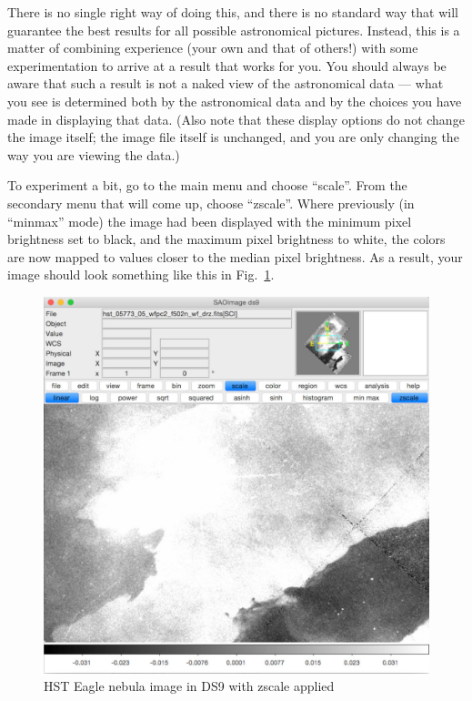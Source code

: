 \documentclass[twocolumn,apj]{openjournal}
\begin{document}
There is no single right way of doing this, and there is no standard way that will guarantee the best results for all possible astronomical pictures. Instead, this is a matter of combining experience (your own and that of others!) with some experimentation to arrive at a result that works for you. You should always be aware that such a result is not a naked view of the astronomical data --- what you see is determined both by the astronomical data and by the choices you have made in displaying that data. (Also note that these display options do not change the image itself; the image file itself is unchanged, and you are only changing the way you are viewing the data.)

To experiment a bit, go to the main menu and choose ``scale''. From the secondary menu that will come up, choose ``zscale''. Where previously (in ``minmax'' mode) the image had been displayed with the minimum pixel brightness set to black, and the maximum pixel brightness to white, the colors are now mapped to values closer to the median pixel brightness. As a result, your image should look something like this in Fig.~\ref{Eagle2}.
\begin{figure}[htbp]
\begin{center}
\includegraphics[width=\linewidth]{ds9-eagle2.jpg}
\caption{HST Eagle nebula image in DS9 with zscale applied}
\label{Eagle2}
\end{center}
\end{figure}
\end{document}
